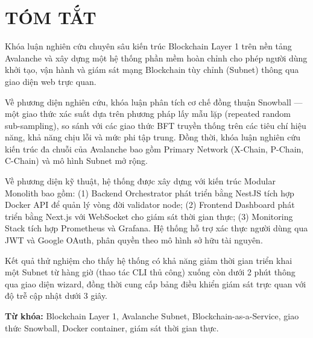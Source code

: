 \chapter*{TÓM TẮT}

Khóa luận nghiên cứu chuyên sâu kiến trúc Blockchain Layer 1 trên nền tảng Avalanche và xây dựng một hệ thống phần mềm hoàn chỉnh cho phép người dùng khởi tạo, vận hành và giám sát mạng Blockchain tùy chỉnh (Subnet) thông qua giao diện web trực quan.

Về phương diện nghiên cứu, khóa luận phân tích cơ chế đồng thuận Snowball --- một giao thức xác suất dựa trên phương pháp lấy mẫu lặp (repeated random sub-sampling), so sánh với các giao thức BFT truyền thống trên các tiêu chí hiệu năng, khả năng chịu lỗi và mức phi tập trung. Đồng thời, khóa luận nghiên cứu kiến trúc đa chuỗi của Avalanche bao gồm Primary Network (X-Chain, P-Chain, C-Chain) và mô hình Subnet mở rộng.

Về phương diện kỹ thuật, hệ thống được xây dựng với kiến trúc Modular Monolith bao gồm: (1) Backend Orchestrator phát triển bằng NestJS tích hợp Docker API để quản lý vòng đời validator node; (2) Frontend Dashboard phát triển bằng Next.js với WebSocket cho giám sát thời gian thực; (3) Monitoring Stack tích hợp Prometheus và Grafana. Hệ thống hỗ trợ xác thực người dùng qua JWT và Google OAuth, phân quyền theo mô hình sở hữu tài nguyên.

Kết quả thử nghiệm cho thấy hệ thống có khả năng giảm thời gian triển khai một Subnet từ hàng giờ (thao tác CLI thủ công) xuống còn dưới 2 phút thông qua giao diện wizard, đồng thời cung cấp bảng điều khiển giám sát trực quan với độ trễ cập nhật dưới 3 giây.

\vspace{0.5cm}
\noindent\textbf{Từ khóa:} Blockchain Layer 1, Avalanche Subnet, Blockchain-as-a-Service, giao thức Snowball, Docker container, giám sát thời gian thực.
